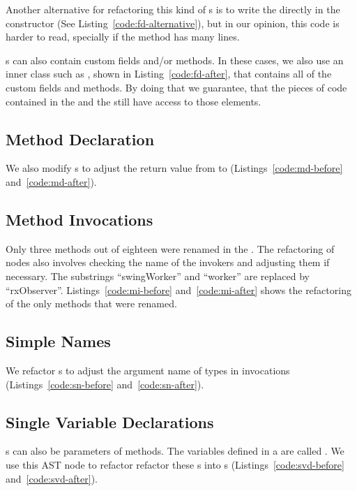 \documentclass[type=bsc,accentcolor=tud9c]{tudthesis}
\begin{document}


Another alternative for refactoring this kind of s is to write the  directly in the constructor (See Listing~\ref{code:fd-alternative}), but in our opinion, this code is harder to read, specially if the method  has many lines.



s can also contain custom fields and/or methods. In these cases, we also use an inner class such as , shown in Listing~\ref{code:fd-after}, that contains all of the custom fields and methods. By doing that we guarantee, that the pieces of code contained in the  and the  still have access to those elements.

\subsection{Method Declaration}
We also modify s to adjust the return value from  to  (Listings~\ref{code:md-before} and~\ref{code:md-after}).



\subsection{Method Invocations}
Only three methods out of eighteen were renamed in the . The refactoring of  nodes also involves checking the name of the invokers and adjusting them if necessary. The substrings ``swingWorker'' and ``worker'' are replaced by ``rxObserver''. Listings~\ref{code:mi-before} and~\ref{code:mi-after} shows the refactoring of the only methods that were renamed.



\subsection{Simple Names}
We refactor s to adjust the argument name of  types in invocations (Listings~\ref{code:sn-before} and~\ref{code:sn-after}).



\subsection{Single Variable Declarations}
s can also be parameters of methods. The variables defined in a  are called . We use this AST node to refactor refactor these s into s (Listings~\ref{code:svd-before} and~\ref{code:svd-after}).
\end{document}
